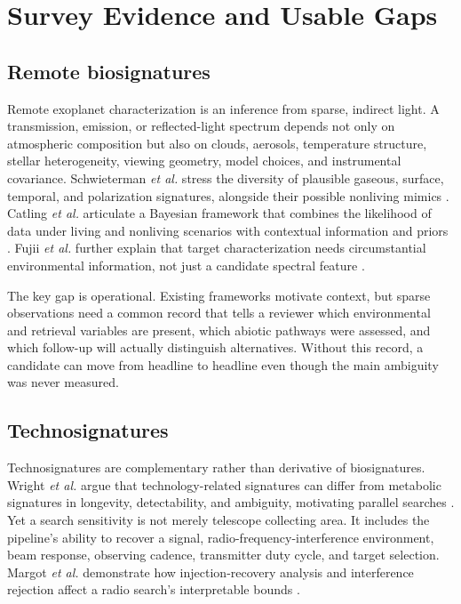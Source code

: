 \documentclass[conference]{IEEEtran}
\begin{document}
\section{Survey Evidence and Usable Gaps}

\subsection{Remote biosignatures}

Remote exoplanet characterization is an inference from sparse, indirect light. A transmission, emission, or reflected-light spectrum depends not only on atmospheric composition but also on clouds, aerosols, temperature structure, stellar heterogeneity, viewing geometry, model choices, and instrumental covariance. Schwieterman \emph{et al.} stress the diversity of plausible gaseous, surface, temporal, and polarization signatures, alongside their possible nonliving mimics \cite{schwieterman2018}. Catling \emph{et al.} articulate a Bayesian framework that combines the likelihood of data under living and nonliving scenarios with contextual information and priors \cite{catling2018}. Fujii \emph{et al.} further explain that target characterization needs circumstantial environmental information, not just a candidate spectral feature \cite{fujii2018}.

The key gap is operational. Existing frameworks motivate context, but sparse observations need a common record that tells a reviewer which environmental and retrieval variables are present, which abiotic pathways were assessed, and which follow-up will actually distinguish alternatives. Without this record, a candidate can move from headline to headline even though the main ambiguity was never measured.

\subsection{Technosignatures}

Technosignatures are complementary rather than derivative of biosignatures. Wright \emph{et al.} argue that technology-related signatures can differ from metabolic signatures in longevity, detectability, and ambiguity, motivating parallel searches \cite{wright2022}. Yet a search sensitivity is not merely telescope collecting area. It includes the pipeline's ability to recover a signal, radio-frequency-interference environment, beam response, observing cadence, transmitter duty cycle, and target selection. Margot \emph{et al.} demonstrate how injection-recovery analysis and interference rejection affect a radio search's interpretable bounds \cite{margot2023}.
\end{document}
